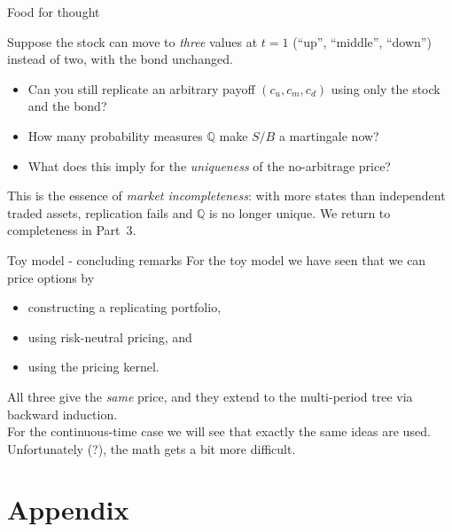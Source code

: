 \documentclass[pdf, handout]{beamer}
\begin{document}
\begin{frame}{Food for thought}
\begin{fftbox}
Suppose the stock can move to \emph{three} values at $t=1$ (``up'', ``middle'', ``down'') instead of two, with the bond unchanged.
\begin{itemize}
\item Can you still replicate an arbitrary payoff $(c_u,c_m,c_d)$ using only the stock and the bond?
\item How many probability measures $\mathbb{Q}$ make $S/B$ a martingale now?
\item What does this imply for the \emph{uniqueness} of the no-arbitrage price?
\end{itemize}
\end{fftbox}
\vspace{1mm}
{\footnotesize This is the essence of \emph{market incompleteness}: with more states than independent traded assets, replication fails and $\mathbb{Q}$ is no longer unique. We return to completeness in Part~3.}
\end{frame}

\begin{frame}{Toy model - concluding remarks}
For the toy model we have seen that we can price options by
\begin{itemize}
\item constructing a replicating portfolio,
\item using risk-neutral pricing, and
\item using the pricing kernel.
\end{itemize}
All three give the \emph{same} price, and they extend to the multi-period tree via backward induction.
\\
\vspace{.5cm}
For the continuous-time case we will see that exactly the same ideas are used. Unfortunately (?), the math gets a bit more difficult.
\end{frame}

\appendix
\section{Appendix}
\end{document}
